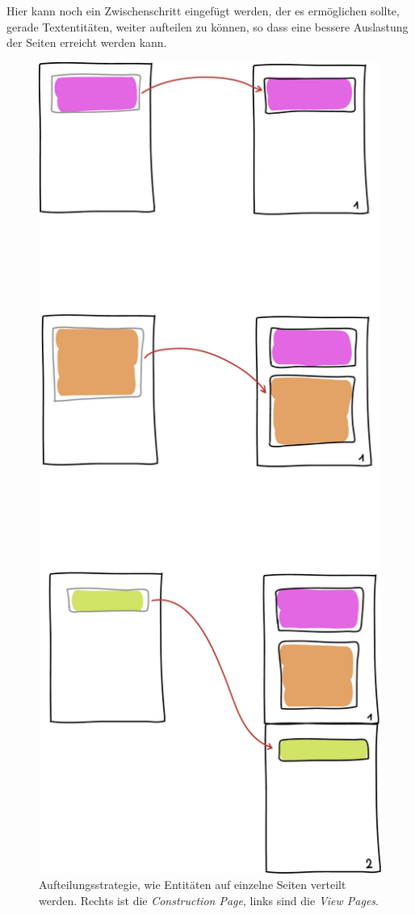 Hier kann noch ein Zwischenschritt eingefügt werden, der es ermöglichen
sollte, gerade Textentitäten, weiter aufteilen zu können, so dass eine
bessere Auslastung der Seiten erreicht werden kann.

\newpage
\begin{figure}[h!]
  \centering
    \includegraphics[height=0.9\textheight]{figures/aufteilungsstrategie.pdf}
  \caption{Aufteilungsstrategie, wie Entitäten auf einzelne Seiten
           verteilt werden. Rechts ist die \emph{Construction Page},
           links sind die \emph{View Pages}.}
  \label{fig-aufteilungsstrategie}
\end{figure}
\newpage

